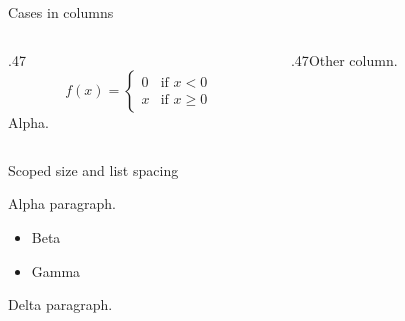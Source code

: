 \documentclass[aspectratio=169]{beamer}
\begin{document}
\begin{frame}{Cases in columns}
  \begin{columns}[T,totalwidth=\textwidth]
    \begin{column}{.47\textwidth}
      \[f(x)=\begin{cases}0&\text{if }x<0\\x&\text{if }x\geq0\end{cases}\]
      Alpha.
    \end{column}
    \begin{column}{.47\textwidth}Other column.\end{column}
  \end{columns}
\end{frame}

\begin{frame}{Scoped size and list spacing}
  \begin{small}
    Alpha paragraph.
    \begin{itemize}
      \setlength{\itemsep}{1em}
      \item Beta
      \item Gamma
    \end{itemize}
  \end{small}
  Delta paragraph.
\end{frame}
\end{document}
